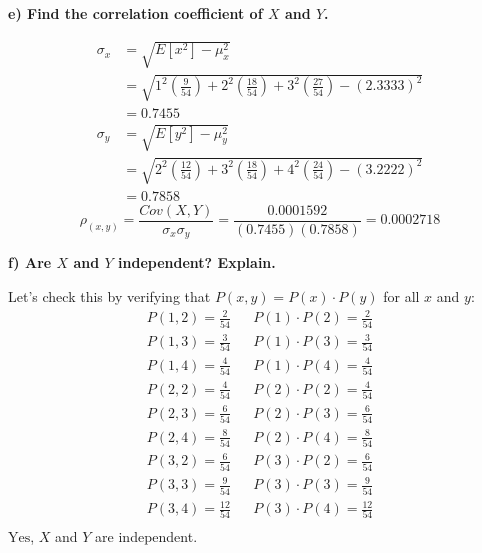 \documentclass[12pt, letter]{article}
\begin{document}
\pagebreak

\qquad \textbf{e) Find the correlation coefficient of $X$ and $Y$.}
\begin{center}
	\begin{align*}
		\sigma_{x} &= \sqrt{E[x^{2}] - \mu_{x}^{2}} \\
		&= \sqrt{1^{2}\left(\frac{9}{54}\right) + 2^{2}\left(\frac{18}{54}\right) + 3^{2}\left(\frac{27}{54}\right) - (2.3333)^{2}} \\
		&= 0.7455 \\
		\sigma_{y} &= \sqrt{E[y^{2}] - \mu_{y}^{2}} \\
		&= \sqrt{2^{2}\left(\frac{12}{54}\right) + 3^{2}\left(\frac{18}{54}\right) + 4^{2}\left(\frac{24}{54}\right) - (3.2222)^{2}} \\
		&= 0.7858
	\end{align*}
	$$\rho_{(x,y)} = \frac{Cov(X,Y)}{\sigma_{x}\sigma_{y}} = \frac{0.0001592}{(0.7455)(0.7858)} = \boxed{0.0002718}$$
\end{center}

\qquad \textbf{f) Are $X$ and $Y$ independent? Explain.}
\begin{center}
	Let's check this by verifying that $P(x,y) = P(x) \cdot P(y)$ for all $x$ and $y$:
	\begin{align*}
		P(1,2) = \frac{2}{54} & & P(1) \cdot P(2) = \frac{2}{54} \\
		P(1,3) = \frac{3}{54} & & P(1) \cdot P(3) = \frac{3}{54} \\
		P(1,4) = \frac{4}{54} & & P(1) \cdot P(4) = \frac{4}{54} \\
		P(2,2) = \frac{4}{54} & & P(2) \cdot P(2) = \frac{4}{54} \\
		P(2,3) = \frac{6}{54} & & P(2) \cdot P(3) = \frac{6}{54} \\
		P(2,4) = \frac{8}{54} & & P(2) \cdot P(4) = \frac{8}{54} \\
		P(3,2) = \frac{6}{54} & & P(3) \cdot P(2) = \frac{6}{54} \\
		P(3,3) = \frac{9}{54} & & P(3) \cdot P(3) = \frac{9}{54} \\
		P(3,4) = \frac{12}{54} & & P(3) \cdot P(4) = \frac{12}{54} \\
	\end{align*}
	$\boxed{\text{Yes}}$, $X$ and $Y$ are independent.
\end{center}
\end{document}
